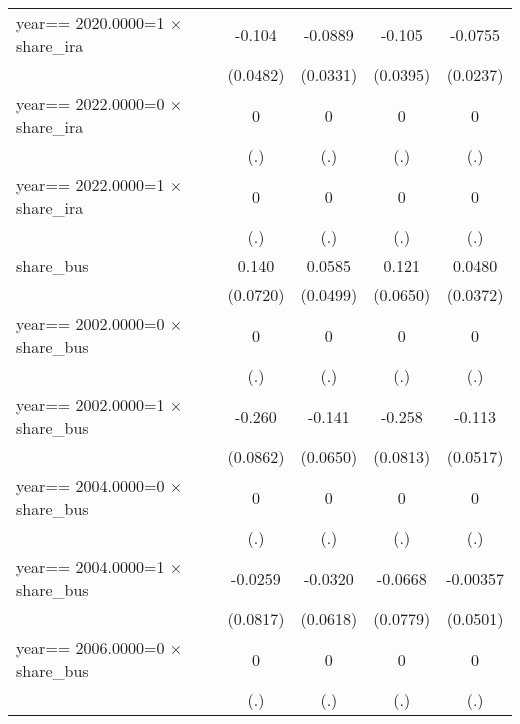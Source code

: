 \begin{table}[htbp]
\begin{tabular}{l*{4}{c}}
year==  2020.0000=1 $\times$ share\_ira&   -0.104\sym{**} &  -0.0889\sym{***}&   -0.105\sym{***}&  -0.0755\sym{***}\\
                & (0.0482)         & (0.0331)         & (0.0395)         & (0.0237)         \\
year==  2022.0000=0 $\times$ share\_ira&        0         &        0         &        0         &        0         \\
                &      (.)         &      (.)         &      (.)         &      (.)         \\
year==  2022.0000=1 $\times$ share\_ira&        0         &        0         &        0         &        0         \\
                &      (.)         &      (.)         &      (.)         &      (.)         \\
share\_bus       &    0.140\sym{*}  &   0.0585         &    0.121\sym{*}  &   0.0480         \\
                & (0.0720)         & (0.0499)         & (0.0650)         & (0.0372)         \\
year==  2002.0000=0 $\times$ share\_bus&        0         &        0         &        0         &        0         \\
                &      (.)         &      (.)         &      (.)         &      (.)         \\
year==  2002.0000=1 $\times$ share\_bus&   -0.260\sym{***}&   -0.141\sym{**} &   -0.258\sym{***}&   -0.113\sym{**} \\
                & (0.0862)         & (0.0650)         & (0.0813)         & (0.0517)         \\
year==  2004.0000=0 $\times$ share\_bus&        0         &        0         &        0         &        0         \\
                &      (.)         &      (.)         &      (.)         &      (.)         \\
year==  2004.0000=1 $\times$ share\_bus&  -0.0259         &  -0.0320         &  -0.0668         & -0.00357         \\
                & (0.0817)         & (0.0618)         & (0.0779)         & (0.0501)         \\
year==  2006.0000=0 $\times$ share\_bus&        0         &        0         &        0         &        0         \\
                &      (.)         &      (.)         &      (.)         &      (.)         \\

\end{tabular}
\end{table}
